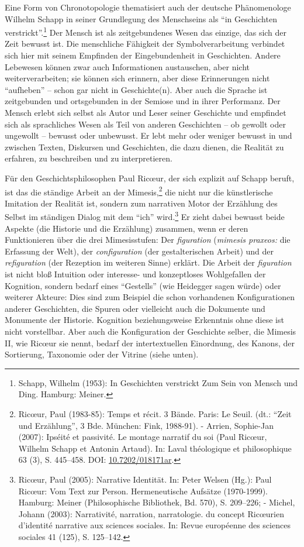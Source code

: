 Eine Form von Chronotopologie thematisiert auch der deutsche
Phänomenologe Wilhelm Schapp in seiner Grundlegung des Menschseins als
\enquote{in Geschichten verstrickt}.\footnote{Schapp, Wilhelm (1953): In
  Geschichten verstrickt Zum Sein von Mensch und Ding. Hamburg: Meiner.}
Der Mensch ist als zeitgebundenes Wesen das einzige, das sich der Zeit
bewusst ist. Die menschliche Fähigkeit der Symbolverarbeitung verbindet
sich hier mit seinem Empfinden der Eingebundenheit in Geschichten.
Andere Lebewesen können zwar auch Informationen austauschen, aber nicht
weiterverarbeiten; sie können sich erinnern, aber diese Erinnerungen
nicht \enquote{aufheben} -- schon gar nicht in Geschichte(n). Aber auch
die Sprache ist zeitgebunden und ortsgebunden in der Semiose und in
ihrer Performanz. Der Mensch erlebt sich selbst als Autor und Leser
seiner Geschichte und empfindet sich als sprachliches Wesen als Teil von
anderen Geschichten -- ob gewollt oder ungewollt -- bewusst oder
unbewusst. Er lebt mehr oder weniger bewusst in und zwischen Texten,
Diskursen und Geschichten, die dazu dienen, die Realität zu erfahren, zu
beschreiben und zu interpretieren.

Für den Geschichtsphilosophen Paul Ricœur, der sich explizit auf Schapp
beruft, ist das die ständige Arbeit an der Mimesis,\footnote{Ricœur,
  Paul (1983-85): Temps et récit. 3 Bände. Paris: Le Seuil. (dt.:
  \enquote{Zeit und Erzählung}, 3 Bde. München: Fink, 1988-91). -
  Arrien, Sophie-Jan (2007): Ipséité et passivité. Le montage narratif
  du soi (Paul Ricœur, Wilhelm Schapp et Antonin Artaud). In: Laval
  théologique et philosophique 63 (3), S. 445--458. DOI:
  \href{http://doi.org/10.7202/018171ar}{10.7202/018171ar}.} die nicht
nur die künstlerische Imitation der Realität ist, sondern zum narrativen
Motor der Erzählung des Selbst im ständigen Dialog mit dem \enquote{ich}
wird.\footnote{Ricœur, Paul (2005): Narrative Identität. In: Peter
  Welsen (Hg.): Paul Ricœur: Vom Text zur Person. Hermeneutische
  Aufsätze (1970-1999). Hamburg: Meiner (Philosophische Bibliothek, Bd.
  570), S. 209--226; - Michel, Johann (2003): Narrativité, narration,
  narratologie. du concept Ricœurien d'identité narrative aux sciences
  sociales. In: Revue européenne des sciences sociales 41 (125), S.
  125--142.} Er zieht dabei bewusst beide Aspekte (die Historie und die
Erzählung) zusammen, wenn er deren Funktionieren über die drei
Mimesisstufen: Der \emph{figuration} (\emph{mimesis praxeos:} die
Erfassung der Welt), der \emph{configuration} (der gestalterischen
Arbeit) und der \emph{refiguration} (der Rezeption im weiteren Sinne)
erklärt. Die Arbeit der \emph{figuration} ist nicht bloß Intuition oder
interesse- und konzeptloses Wohlgefallen der Kognition, sondern bedarf
eines \enquote{Gestells} (wie Heidegger sagen würde) oder weiterer
Akteure: Dies sind zum Beispiel die schon vorhandenen Konfigurationen
anderer Geschichten, die Spuren oder vielleicht auch die Dokumente und
Monumente der Historie. Kognition beziehungsweise Erkenntnis ohne diese
ist nicht vorstellbar. Aber auch die Konfiguration der Geschichte
selber, die Mimesis II, wie Ricœur sie nennt, bedarf der
intertextuellen Einordnung, des Kanons, der Sortierung, Taxonomie oder
der Vitrine (siehe unten).

